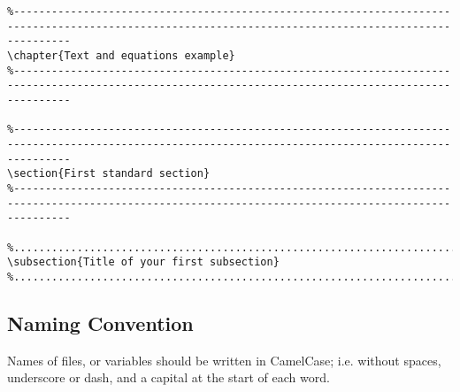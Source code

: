 \begin{scriptsize}
\begin{verbatim}
%-----------------------------------------------------------------------------------------------------------------------------------------------------
\chapter{Text and equations example}
%-----------------------------------------------------------------------------------------------------------------------------------------------------

%-----------------------------------------------------------------------------------------------------------------------------------------------------
\section{First standard section}
%-----------------------------------------------------------------------------------------------------------------------------------------------------

%.....................................................................................................................................................
\subsection{Title of your first subsection}
%.....................................................................................................................................................
\end{verbatim}
\end{scriptsize}

\subsection{Naming Convention}

Names of files, or variables should be written in CamelCase; i.e. without spaces, underscore or dash, and a capital at the start of each word.

